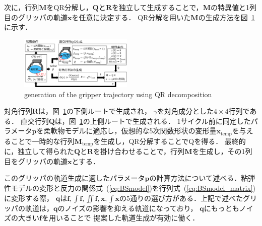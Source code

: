 \documentclass[a4paper]{jarticle}
\begin{document}
次に，行列$\mathbf{M}$をQR分解し，$\mathbf{Q}$と$\mathbf{R}$を独立して生成することで，$\mathbf{M}$の特異値と1列目のグリッパの軌道$\boldsymbol{x}$を任意に決定する．
QR分解を用いた$\mathbf{M}$の生成方法を図~\ref{fig:QR_traj}に示す．
\begin{figure}[tb]
    \centering
    \includegraphics[width=0.48\textwidth]{QR_traj.pdf}
    \captionsetup{width=0.9\linewidth} %
    \caption{generation of the gripper trajectory using QR decomposition}
    \label{fig:QR_traj}
\end{figure}
対角行列$\mathbf{R}$は，図~\ref{fig:QR_traj}の下側ルートで生成され，
$\gamma$を対角成分とした$4\times4$行列である．
直交行列$\mathbf{Q}$は，図~\ref{fig:QR_traj}の上側ルートで生成される．
1サイクル前に同定したパラメータ$\mathbf{p}$を柔軟物モデルに適応し，仮想的な5次関数形状の変形量$\boldsymbol{x}_{\mathrm{temp}}$を与えることで一時的な行列$\mathbf{M}_{\mathrm{temp}}$を生成し，QR分解することでQを得る．
最終的に，独立して得られた$\mathbf{Q}$と$\mathbf{R}$を掛け合わせることで，行列$\mathbf{M}$を生成し，その1列目をグリッパの軌道$\boldsymbol{x}$とする．

このグリッパの軌道生成に適したパラメータ$\mathbf{p}$の計算方法について述べる．粘弾性モデルの変形と反力の関係式~(\ref{eq:BSmodel})を行列式~(\ref{eq:BSmodel_matrix})に変形する際，
$\mathbf{q}$は$\boldsymbol{f}, \int{\boldsymbol{f}} , \iint{\boldsymbol{f}}, \boldsymbol{x} , \int{\boldsymbol{x}}$の5通りの選び方がある．上記で述べたグリッパの軌道は，$\mathbf{q}$のノイズの影響を抑える軌道になっており，
$\mathbf{q}$にもっともノイズの大きい$\boldsymbol{f}$を用いることで
提案した軌道生成が有効に働く．

\end{document}
